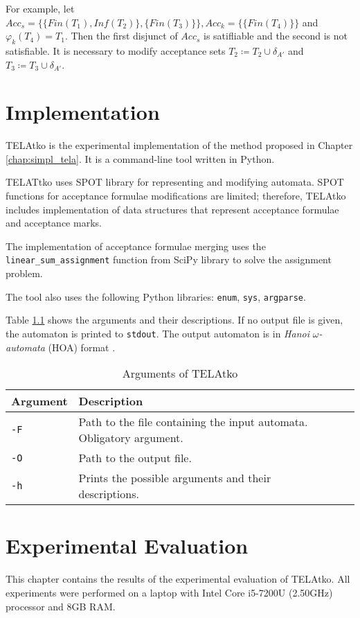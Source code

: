 \documentclass[
  digital, %
  twoside, %
  table,   %
  lof,     %
  lot,     %
]{fithesis3}
\begin{document}
For example, let $Acc_s = \{\{Fin(T_1), Inf(T_2)\}, \{Fin(T_3)\}\}, Acc_k = \{\{Fin(T_4)\}\}$ and $\varphi_k (T_4) = T_1$. Then the first disjunct of $Acc_s$ is satifliable and the second is not satisfiable. It is necessary to modify acceptance sets $T_2 \coloneqq T_2 \cup \delta_{A'}$ and $T_3 \coloneqq T_3 \cup \delta_{A'}$.

\chapter{Implementation}
TELAtko is the experimental implementation of the method proposed in Chapter \ref{chap:simpl_tela}. It is a command-line tool written in Python.

TELATtko uses SPOT library \cite{spot} for representing and modifying automata. SPOT functions for acceptance formulae modifications are limited; therefore, TELAtko includes implementation of data structures that represent acceptance formulae and acceptance marks. 

The implementation of acceptance formulae merging uses the \texttt{linear\_sum\_assignment} function from SciPy library \cite{scipy} to solve the assignment problem. 

The tool also uses the following Python libraries: \texttt{enum}, \texttt{sys}, \texttt{argparse}.

Table \ref{tab:arguments} shows the arguments and their descriptions. If no output file is given, the automaton is printed to \texttt{stdout}. The output automaton is in \textit{Hanoi} $\omega$\textit{-automata} (HOA) format \cite{hoa}.

\begin{table}[h]
  \begin{tabularx}{\textwidth}{lXXX}
    \toprule
    Argument & Description \\
    \midrule
    \texttt{-F} & Path to the file containing the input automata. Obligatory argument. \\
    \texttt{-O} & Path to the output file. \\
    \texttt{-h} & Prints the possible arguments and their descriptions. \\    
    \bottomrule
  \end{tabularx}
  \caption{Arguments of TELAtko}
  \label{tab:arguments}
\end{table}

\chapter{Experimental Evaluation}
This chapter contains the results of the experimental evaluation of TELAtko. All experiments were performed on a laptop with Intel Core i5-7200U (2.50GHz) processor and 8GB RAM. 
\end{document}
